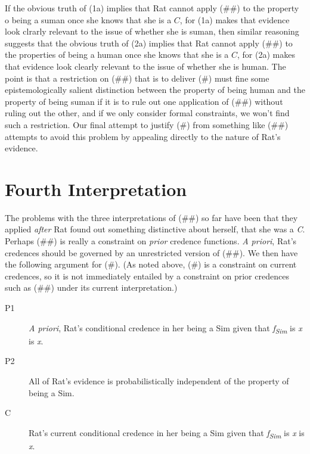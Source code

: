 \noindent If the obvious truth of (1a) implies that Rat cannot apply (\#\#) to the property o being a suman once she knows that she is a \(C\), for (1a) makes that evidence look clrarly relevant to the issue of whether she is suman, then similar reasoning suggests that the obvious truth of (2a) implies that Rat cannot apply (\#\#) to the properties of being a human once she knows that she is a \(C\), for (2a) makes that evidence look clearly relevant to the issue of whether she is human. The point is that a restriction on (\#\#) that is to deliver (\#) must fine some epistemologically salient distinction between the property of being human and the property of being suman if it is to rule out one application of (\#\#) without ruling out the other, and if we only consider formal constraints, we won't find such a restriction. Our final attempt to justify (\#) from something like (\#\#) attempts to avoid this problem by appealing directly to the nature of Rat's evidence.

\section{Fourth Interpretation}

The problems with the three interpretations of (\#\#) so far have been that they applied \textit{after} Rat found out something distinctive about herself, that she was a \textit{C}. Perhaps (\#\#) is really a constraint on \textit{prior} credence functions. \textit{A priori}, Rat's credences should be governed by an unrestricted version of (\#\#). We then have the following argument for (\#). (As noted above, (\#) is a constraint on current credences, so it is not immediately entailed by a constraint on prior credences such as (\#\#) under its current interpretation.)

\begin{description}
\item [P1] \textit{A priori}, Rat's conditional credence in her being a Sim given that \textit{f}\textit{\textsubscript{Sim}} is \textit{x} is \textit{x}.
\item [P2] All of Rat's evidence is probabilistically independent of the property of being a Sim.
\item [C] Rat's current conditional credence in her being a Sim given that \textit{f}\textit{\textsubscript{Sim}} is \textit{x} is \textit{x}.
\end{description}

